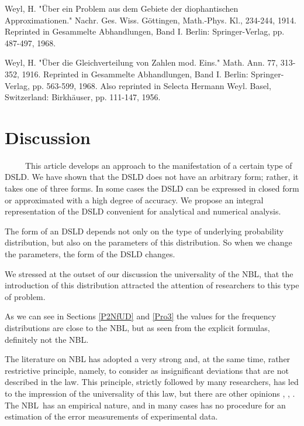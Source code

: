 \documentclass[titlepage,fleqn]{article}%
\begin{document}
Weyl, H. "\"{U}ber ein Problem aus dem Gebiete der diophantischen
Approximationen." Nachr. Ges. Wiss. G\"{o}ttingen, Math.-Phys. Kl., 234-244,
1914. Reprinted in Gesammelte Abhandlungen, Band I. Berlin: Springer-Verlag,
pp. 487-497, 1968.

Weyl, H. "\"{U}ber die Gleichverteilung von Zahlen mod. Eins." Math. Ann. 77,
313-352, 1916. Reprinted in Gesammelte Abhandlungen, Band I. Berlin:
Springer-Verlag, pp. 563-599, 1968. Also reprinted in Selecta Hermann Weyl.
Basel, Switzerland: Birkh\"{a}user, pp. 111-147, 1956.

\section{Discussion}%

\label{Discussion}%


\ \ \ \ \ This article develops an approach to the manifestation of a certain
type of DSLD. We have shown that the DSLD does not have an arbitrary form;
rather, it takes one of three forms. In some cases the DSLD can be expressed
in closed form or approximated with a high degree of accuracy. We propose an
integral representation of the DSLD convenient for analytical and numerical analysis.

The form of an DSLD depends not only on the type of underlying probability
distribution, but also on the parameters of this distribution. So when we
change the parameters, the form of the DSLD changes.

We stressed at the outset of our discussion the universality of the NBL, that
the introduction of this distribution attracted the attention of researchers
to this type of problem.

As we can see in Sections
\ref{P2NfUD} and \ref{Pro3}
the values for the frequency distributions are close to the NBL, but as seen
from the explicit formulas, definitely not the NBL.

The literature on NBL has adopted a very strong and, at the same time, rather
restrictive principle, namely, to consider as insignificant deviations that
are not described in the law. This principle, strictly followed by many
researchers, has led to the impression of the universality of this law, but
there are other opinions
\cite{arnold0},
\cite{arnold1},
\cite{bergerhill}%
. The NBL\ has an empirical nature, and in many cases has no procedure for an
estimation of the error measurements of experimental data.
\end{document}
